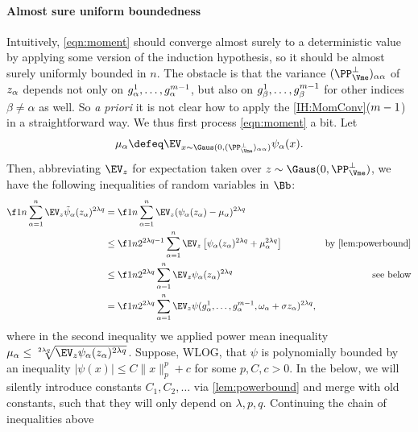 \documentclass[main.tex]{subfiles}
\begin{document}
\paragraph{Almost sure uniform boundedness}
Intuitively, \cref{eqn:moment} should converge almost surely to a deterministic value by applying some version of the induction hypothesis, so it should be almost surely uniformly bounded in $n$.
The obstacle is that the variance $(\PP_{\Vme}^\perp)_{\alpha\alpha}$ of $z_\alpha$ depends not only on $g^1_\alpha, \ldots, g^{m-1}_\alpha$, but also on $g^1_\beta, \ldots, g^{m-1}_\beta$ for other indices $\beta \not= \alpha$ as well.
So \textit{a priori} it is not clear how to apply the \ref{IH:MomConv}($m-1$) in a straightforward way.
We thus first process \cref{eqn:moment} a bit.
Let
\[\mu_\alpha \defeq \EV_{x \sim \Gaus(0, (\PP^\perp_{\Vme})_{\alpha\alpha})} \psi_\alpha(x).\]
Then, abbreviating $\EV_z$ for expectation taken over $\rvec \sim \Gaus(0, \PP^\perp_{\Vme})$, we have the following inequalities of random variables in $\Bb$:
\begin{align*}
  \f 1 n \sum_{\alpha=1}^n \EV_z \tilde \psi_\alpha(\rvec_\alpha)^{2\lambda q}
  &=
      \f 1 n \sum_{\alpha=1}^n \EV_z (\psi_\alpha(\rvec_\alpha) - \mu_\alpha)^{2\lambda q}
      \\
  &\le
      \f 1 n 2^{2\lambda q - 1}
          \sum_{\alpha=1}^n
              \EV_z 
                  \left[
                      \psi_\alpha(\rvec_\alpha)^{2\lambda q} + \mu_\alpha^{2\lambda q}
                  \right]
  &{\text{by \cref{lem:powerbound}}}
      \\
  &\le
      \f 1 n 2^{2\lambda q}
          \sum_{\alpha=1}^n
              \EV_z 
                  \psi_\alpha(\rvec_\alpha)^{2\lambda q}
  &\text{see below}
      \\
  &=
      \f 1 n 2^{2\lambda q}
      \sum_{\alpha=1}^n
          \EV_z 
              \psi(g^1_\alpha, \ldots, g^{\MM-1}_\alpha, \omega_\alpha + \sigma \rvec_\alpha )^{2\lambda q}
      ,
\end{align*}
where in the second inequality we applied power mean inequality $\mu_\alpha \le \sqrt[2\lambda q]{\EV_z\psi_\alpha(\rvec_\alpha)^{2\lambda q}}$.
Suppose, WLOG, that $\psi$ is polynomially bounded by an inequality $|\psi(x)| \le C \|x\|^p_p + c$ for some $p, C, c > 0$.
In the below, we will silently introduce constants $C_1, C_2, \ldots$ via \cref{lem:powerbound} and merge with old constants, such that they will only depend on $\lambda, p, q$.
Continuing the chain of inequalities above
\end{document}
